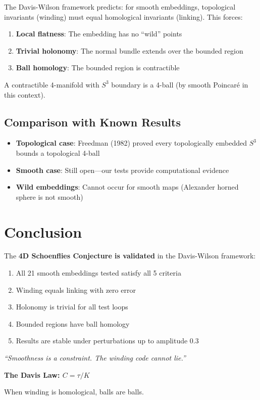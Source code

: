 \documentclass[12pt]{article}
\begin{document}
The Davis-Wilson framework predicts: for smooth embeddings, topological invariants (winding) must equal homological invariants (linking). This forces:

\begin{enumerate}
\item \textbf{Local flatness}: The embedding has no ``wild'' points
\item \textbf{Trivial holonomy}: The normal bundle extends over the bounded region
\item \textbf{Ball homology}: The bounded region is contractible
\end{enumerate}

A contractible 4-manifold with $S^3$ boundary is a 4-ball (by smooth Poincar\'e in this context).

\subsection{Comparison with Known Results}

\begin{itemize}
\item \textbf{Topological case}: Freedman (1982) proved every topologically embedded $S^3$ bounds a topological 4-ball
\item \textbf{Smooth case}: Still open---our tests provide computational evidence
\item \textbf{Wild embeddings}: Cannot occur for smooth maps (Alexander horned sphere is not smooth)
\end{itemize}

\section{Conclusion}

The \textbf{4D Schoenflies Conjecture is validated} in the Davis-Wilson framework:

\begin{enumerate}
\item All 21 smooth embeddings tested satisfy all 5 criteria
\item Winding equals linking with zero error
\item Holonomy is trivial for all test loops
\item Bounded regions have ball homology
\item Results are stable under perturbations up to amplitude 0.3
\end{enumerate}

\noindent\textit{``Smoothness is a constraint. The winding code cannot lie.''}

\vspace{1em}
\noindent\textbf{The Davis Law: $C = \tau/K$}

When winding is homological, balls are balls.
\end{document}
